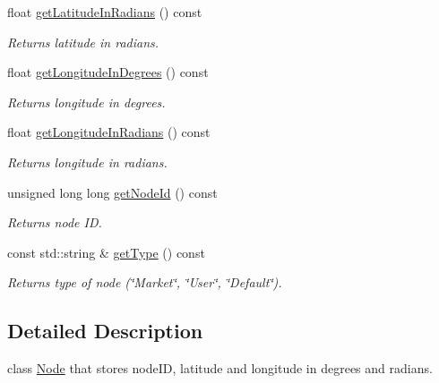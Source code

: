\begin{DoxyCompactItemize}
\hypertarget{class_node_a70717903373e839ee0a1d498fa1841f1}{}\label{class_node_a70717903373e839ee0a1d498fa1841f1} 
float \hyperlink{class_node_a70717903373e839ee0a1d498fa1841f1}{get\+Latitude\+In\+Radians} () const
\begin{DoxyCompactList}\small\item\em Returns latitude in radians. \end{DoxyCompactList}\item 
\hypertarget{class_node_ae1128c36ac2a295acc1d2e9597c61307}{}\label{class_node_ae1128c36ac2a295acc1d2e9597c61307} 
float \hyperlink{class_node_ae1128c36ac2a295acc1d2e9597c61307}{get\+Longitude\+In\+Degrees} () const
\begin{DoxyCompactList}\small\item\em Returns longitude in degrees. \end{DoxyCompactList}\item 
\hypertarget{class_node_a9d38e0d02ea796be11f6701da9d195b4}{}\label{class_node_a9d38e0d02ea796be11f6701da9d195b4} 
float \hyperlink{class_node_a9d38e0d02ea796be11f6701da9d195b4}{get\+Longitude\+In\+Radians} () const
\begin{DoxyCompactList}\small\item\em Returns longitude in radians. \end{DoxyCompactList}\item 
\hypertarget{class_node_a1ffdec2aada47f0b859a977d6a995442}{}\label{class_node_a1ffdec2aada47f0b859a977d6a995442} 
unsigned long long \hyperlink{class_node_a1ffdec2aada47f0b859a977d6a995442}{get\+Node\+Id} () const
\begin{DoxyCompactList}\small\item\em Returns node ID. \end{DoxyCompactList}\item 
\hypertarget{class_node_a78921dc9b99294184258c233ac426c4b}{}\label{class_node_a78921dc9b99294184258c233ac426c4b} 
const std\+::string \& \hyperlink{class_node_a78921dc9b99294184258c233ac426c4b}{get\+Type} () const
\begin{DoxyCompactList}\small\item\em Returns type of node (\char`\"{}\+Market\char`\"{}, \char`\"{}\+User\char`\"{}, \char`\"{}\+Default\char`\"{}). \end{DoxyCompactList}\end{DoxyCompactItemize}


\subsection{Detailed Description}
class \hyperlink{class_node}{Node} that stores node\+ID, latitude and longitude in degrees and radians. 

